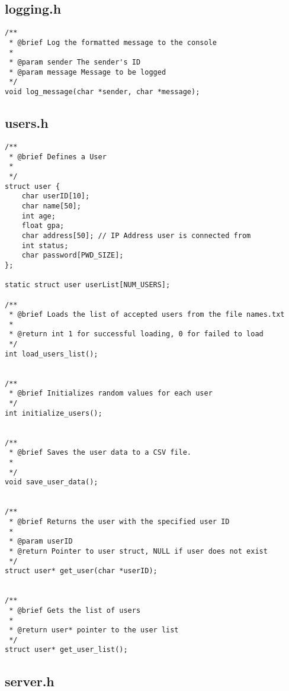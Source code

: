 \documentclass{article}
\begin{document}
\subsection*{logging.h}

\begin{lstlisting}[style=CStyle]
/**
 * @brief Log the formatted message to the console
 * 
 * @param sender The sender's ID
 * @param message Message to be logged
 */
void log_message(char *sender, char *message);
\end{lstlisting}


\subsection*{users.h}

\begin{lstlisting}[style=CStyle]
/**
 * @brief Defines a User
 * 
 */
struct user {
    char userID[10];
    char name[50];
    int age;
    float gpa;
    char address[50]; // IP Address user is connected from
    int status;
    char password[PWD_SIZE];
};

static struct user userList[NUM_USERS];

/**
 * @brief Loads the list of accepted users from the file names.txt
 * 
 * @return int 1 for successful loading, 0 for failed to load
 */
int load_users_list();


/**
 * @brief Initializes random values for each user 
 */
int initialize_users();


/**
 * @brief Saves the user data to a CSV file.
 * 
 */
void save_user_data();


/**
 * @brief Returns the user with the specified user ID
 * 
 * @param userID
 * @return Pointer to user struct, NULL if user does not exist
 */
struct user* get_user(char *userID);


/**
 * @brief Gets the list of users 
 * 
 * @return user* pointer to the user list
 */
struct user* get_user_list();
\end{lstlisting}

\pagebreak
\subsection*{server.h}
\end{document}
